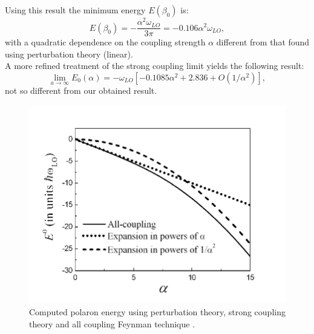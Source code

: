 \documentclass[12pt, a4paper]{report}
\numberwithin{equation}{section}
\begin{document}
Using this result the minimum energy $E(\beta_0)$ is:
\begin{equation}
    E(\beta_0)=-\frac{\alpha^2\omega_{LO}}{3\pi}=-0.106\alpha^2\omega_{LO},
\end{equation}
with a quadratic dependence on the coupling strength $\alpha$ different from that found using perturbation theory (linear).\\
A more refined treatment of the strong coupling limit \cite{miyake1976ground} yields the following result:
\begin{equation}
    \lim_{a\to\infty}E_0(\alpha)=-\omega_{LO}\left[-0.1085\alpha^2+2.836+O(1/\alpha^2)\right],
\end{equation}
not so different from our obtained result.
\begin{figure}[H]
    \centering
    \includegraphics[scale=1.0]{Feynman-polaron-energy-as-a-function-of-a-the-all-coupling-theory.png}
    \caption{Computed polaron energy using perturbation theory, strong coupling theory and all coupling 
    Feynman technique \cite{article_coupling}.}
    \label{fig:coupling_strength_Froehlich}
\end{figure}
\end{document}
